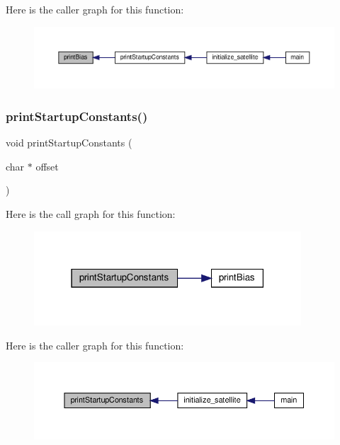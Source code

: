 Here is the caller graph for this function\+:
\nopagebreak
\begin{figure}[H]
\begin{center}
\leavevmode
\includegraphics[width=350pt]{i2c-interface_8c_a14f7a41ccc0cdae430b5c7086a34e9c0_icgraph}
\end{center}
\end{figure}
\mbox{\label{i2c-interface_8c_a7584f35073e31c1833be60c696482e9a}} 
\subsubsection{\texorpdfstring{print\+Startup\+Constants()}{printStartupConstants()}}
{\footnotesize\ttfamily void print\+Startup\+Constants (\begin{DoxyParamCaption}\item[{char $\ast$}]{offset }\end{DoxyParamCaption})}

Here is the call graph for this function\+:
\nopagebreak
\begin{figure}[H]
\begin{center}
\leavevmode
\includegraphics[width=283pt]{i2c-interface_8c_a7584f35073e31c1833be60c696482e9a_cgraph}
\end{center}
\end{figure}
Here is the caller graph for this function\+:
\nopagebreak
\begin{figure}[H]
\begin{center}
\leavevmode
\includegraphics[width=350pt]{i2c-interface_8c_a7584f35073e31c1833be60c696482e9a_icgraph}
\end{center}
\end{figure}
\mbox{\label{i2c-interface_8c_a10fba4cab7c9dfec51afa190dba4c1e9}} 
